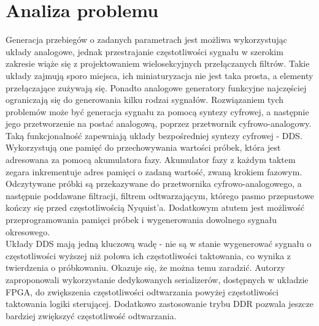 \section{Analiza problemu}
    Generacja przebiegów o zadanych parametrach jest możliwa wykorzystując układy analogowe, 
    jednak przestrajanie częstotliwości sygnału w szerokim zakresie wiąże się z projektowaniem 
    wielosekcyjnych przełączanych filtrów. Takie układy zajmują sporo miejsca, ich miniaturyzacja 
    nie jest taka prosta, a elementy przełączające zużywają się. Ponadto analogowe generatory 
    funkcyjne najczęściej ograniczają się do generowania kilku rodzai sygnałów. Rozwiązaniem 
    tych problemów może być generacja sygnału za pomocą syntezy cyfrowej, a następnie jego 
    przetworzenie na postać analogową, poprzez przetwornik cyfrowo-analogowy. Taką 
    funkcjonalność zapewniają układy bezpośredniej syntezy cyfrowej - DDS. Wykorzystują one 
    pamięć do przechowywania wartości próbek, która jest adresowana za pomocą akumulatora fazy. 
    Akumulator fazy z każdym taktem zegara inkrementuje adres pamięci o zadaną wartość, zwaną krokiem fazowym. 
    Odczytywane próbki są przekazywane do przetwornika cyfrowo-analogowego, a następnie poddawane filtracji, 
    filtrem odtwarzającym, którego pasmo przepustowe kończy się przed częstotliwością Nyquist'a. 
    Dodatkowym atutem jest możliwość przeprogramowania pamięci próbek i wygenerowania 
    dowolnego sygnału okresowego.\\
    Układy DDS mają jedną kluczową wadę - nie są w stanie wygenerować sygnału o częstotliwości 
    wyższej niż połowa ich częstotliwości taktowania, co wynika z twierdzenia o próbkowaniu. 
    Okazuje się, że można temu zaradzić. Autorzy \cite{FPGA_hs_gen} zaproponowali 
    wykorzystanie dedykowanych serializerów, dostępnych w układzie FPGA, do zwiększenia 
    częstotliwości odtwarzania powyżej częstotliwości taktowania logiki sterującej. 
    Dodatkowo zastosowanie trybu DDR pozwala jeszcze bardziej zwiększyć częstotliwość 
    odtwarzania. 